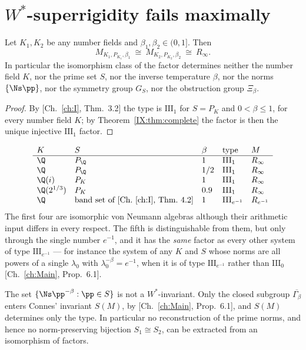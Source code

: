\section{$W^*$-superrigidity fails maximally}

\begin{theorem}[No reconstruction]\label{IX:thm:fails}
Let $K_1,K_2$ be any number fields and $\beta_1,\beta_2\in(0,1]$. Then
\[
M_{K_1,P_{K_1},\beta_1}\ \cong\ M_{K_2,P_{K_2},\beta_2}\ \cong\ R_\infty .
\]
In particular the isomorphism class of the factor determines neither the number field $K$,
nor the prime set $S$, nor the inverse temperature $\beta$, nor the norms $\{\Ns\pp\}$, nor
the symmetry group $G_S$, nor the obstruction group $\Xi_\beta$.
\end{theorem}

\begin{proof}
By [Ch.~\ref{ch:I}, Thm.~3.2] the type is $\mathrm{III}_1$ for $S=P_K$ and $0<\beta\le1$, for
every number field $K$; by Theorem~\ref{IX:thm:complete} the factor is then the unique injective
$\mathrm{III}_1$ factor.
\end{proof}

\begin{example}\label{IX:ex:collapse}
\[
\begin{array}{lllll}
K & S & \beta & \text{type} & M\\\hline
\Q & P_\Q & 1 & \mathrm{III}_1 & R_\infty\\
\Q & P_\Q & 1/2 & \mathrm{III}_1 & R_\infty\\
\Q(i) & P_K & 1 & \mathrm{III}_1 & R_\infty\\
\Q(2^{1/3}) & P_K & 0.9 & \mathrm{III}_1 & R_\infty\\
\Q & \text{band set of [Ch.~\ref{ch:I}, Thm.~4.2]} & 1 & \mathrm{III}_{e^{-1}} & R_{e^{-1}}
\end{array}
\]
The first four are isomorphic von Neumann algebras although their arithmetic input differs in
every respect. The fifth is distinguishable from them, but only through the single number
$e^{-1}$, and it has the \emph{same} factor as every other system of type
$\mathrm{III}_{e^{-1}}$ --- for instance the system of any $K$ and $S$ whose norms are all
powers of a single $\lambda_0$ with $\lambda_0^{-\beta}=e^{-1}$, when it is of type
$\mathrm{III}_{e^{-1}}$ rather than $\mathrm{III}_0$ [Ch.~\ref{ch:Main}, Prop.~6.1].
\end{example}

\begin{corollary}\label{IX:cor:pointspec}
The set $\{\Ns\pp^{-\beta}:\pp\in S\}$ is not a $W^*$-invariant. Only the closed subgroup
$\overline{\Gamma_\beta}$ enters Connes' invariant $S(M)$, by [Ch.~\ref{ch:Main}, Prop.~6.1], and
$S(M)$ determines only the type. In particular no reconstruction of the prime norms, and
hence no norm-preserving bijection $S_1\cong S_2$, can be extracted from an isomorphism of
factors.
\end{corollary}

